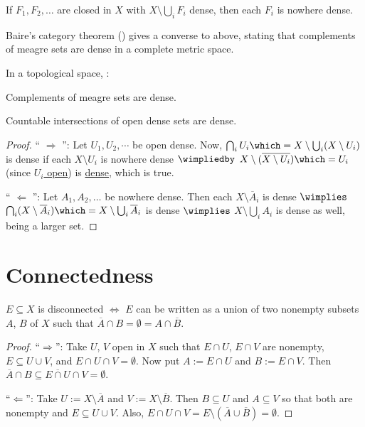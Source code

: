 	\begin{lem}
		If $F_1, F_2, \ldots$ are closed in $X$ with $X\setminus\bigcup_i F_i$ dense, then each $F_i$ is nowhere dense.
	\end{lem}
	
	\begin{rmk}
		Baire's category theorem () gives a converse to above, stating that complements of meagre sets are dense in a complete metric space.
	\end{rmk}
	
	\begin{prp}\label{PRP: versions of BCT}
		In a topological space, \tfae:
		\begin{mylist}
			\item\label{PRPi: versions of BCT} Complements of meagre sets are dense.
			\item\label{PRPii: versions of BCT} Countable intersections of open dense sets are dense.
		\end{mylist}
	\end{prp}
	
	\begin{proof}
		`` $\Rightarrow$ '': Let $U_1, U_2, \cdots$ be open dense. Now, $\bigcap_i U_i \which= X\setminus\bigcup_i(X\setminus U_i)$ is dense if each $X\setminus U_i$ is nowhere dense $\wimpliedby$ $X\setminus(\overline{X\setminus U_i})\which= U_i$ (since \uline{$U_i$ open}) is \uline{dense}, which is true.
		
		`` $\Leftarrow$ '': Let $A_1, A_2, \ldots$ be nowhere dense. Then each $X\setminus\overline A_i$ is dense $\wimplies$ $\bigcap_i(X\setminus \overline A_i)\which= X\setminus\bigcup_i\overline A_i$ is dense $\wimplies$ $X\setminus\bigcup_i A_i$ is dense as well, being a larger set.
	\end{proof}
	
	
	
	
\section{Connectedness}

	\begin{lem}
		$E\subseteq X$ is disconnected $\iff$ $E$ can be written as a union of two nonempty subsets $A$, $B$ of $X$ such that $\overline A\cap B = \emptyset = A\cap\overline B$.
	\end{lem}
	
	\begin{proof}
		``$\Rightarrow$'': Take $U$, $V$ open in $X$ such that $E\cap U$, $E\cap V$ are nonempty, $E\subseteq U\cup V$, and $E\cap U\cap V = \emptyset$. Now put $A := E\cap U$ and $B := E\cap V$. Then $\overline A\cap B\subseteq \overline{E\cap U}\cap V = \emptyset$.
		
		``$\Leftarrow$'': Take $U := X\setminus \overline A$ and $V := X\setminus \overline B$. Then $B\subseteq U$ and $A\subseteq V$ so that both are nonempty and $E\subseteq U\cup V$. Also, $E\cap U\cap V = E\setminus(\overline A\cup\overline B) = \emptyset$.
	\end{proof}
	
